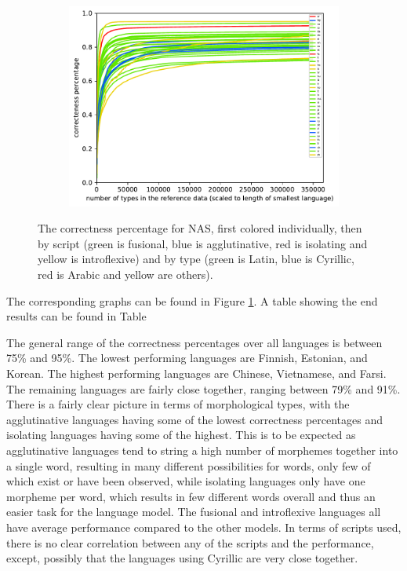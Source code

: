 \documentclass[11pt,a4paper,twoside,openright]{scrbook}
\begin{document}
\begin{figure}[h]
    \begin{subfigure}[b]{0.32\textwidth}
    	\centering
        \includegraphics[width=\textwidth]{graphs/nas/scripts/norm_huge_type_token_performance}
    \end{subfigure}
    \caption{The correctness percentage for NAS, first colored individually, then by script (green is fusional, blue is agglutinative, red is isolating and yellow is introflexive) and by type (green is Latin, blue is Cyrillic, red is Arabic and yellow are others).}
	\label{Figure:nas_norm_huge_type_token_performance}
\end{figure}

The corresponding graphs can be found in Figure \ref{Figure:nas_norm_huge_type_token_performance}. A table showing the end results can be found in Table \

The general range of the correctness percentages over all languages is between 75\% and 95\%. The lowest performing languages are Finnish, Estonian, and Korean. The highest performing languages are Chinese, Vietnamese, and Farsi. The remaining languages are fairly close together, ranging between 79\% and 91\%. There is a fairly clear picture in terms of morphological types, with the agglutinative languages having some of the lowest correctness percentages and isolating languages having some of the highest. This is to be expected as agglutinative languages tend to string a high number of morphemes together into a single word, resulting in many different possibilities for words, only few of which exist or have been observed, while isolating languages only have one morpheme per word, which results in few different words overall and thus an easier task for the language model. The fusional and introflexive languages all have average performance compared to the other models. In terms of scripts used, there is no clear correlation between any of the scripts and the performance, except, possibly that the languages using Cyrillic are very close together.
\end{document}
